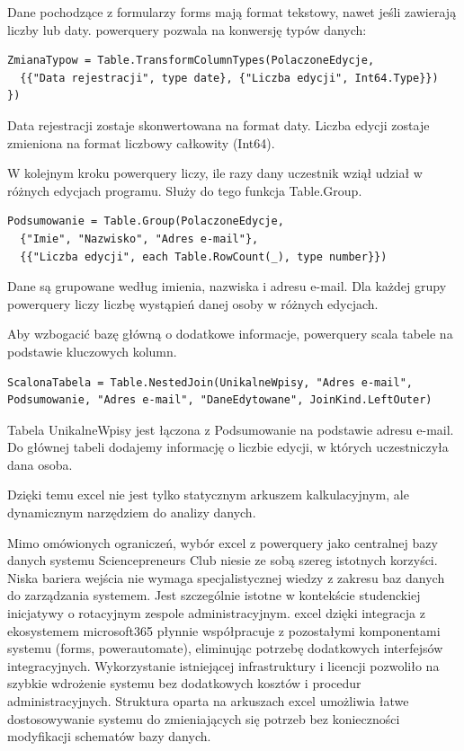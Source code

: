 Dane pochodzące z formularzy \gls{forms} mają format tekstowy, nawet jeśli zawierają liczby lub daty. \gls{powerquery} pozwala na konwersję typów danych:

\begin{lstlisting}[language=PowerQueryM, caption=Kod zmieniający formaty danych w Power Query w języku M źródło: opracowanie własne]
ZmianaTypow = Table.TransformColumnTypes(PolaczoneEdycje,
  {{"Data rejestracji", type date}, {"Liczba edycji", Int64.Type}})
})
\end{lstlisting}
Data rejestracji zostaje skonwertowana na format daty.
Liczba edycji zostaje zmieniona na format liczbowy całkowity (Int64).

W kolejnym kroku \gls{powerquery} liczy, ile razy dany uczestnik wziął udział w różnych edycjach programu. Służy do tego funkcja Table.Group.

\begin{lstlisting}[language=PowerQueryM, caption=Kod grupujący i liczący udział uczestnika w Power Query w języku M źródło: opracowanie własne]
Podsumowanie = Table.Group(PolaczoneEdycje, 
  {"Imie", "Nazwisko", "Adres e-mail"},
  {{"Liczba edycji", each Table.RowCount(_), type number}})
\end{lstlisting}

Dane są grupowane według imienia, nazwiska i adresu e-mail.
Dla każdej grupy \gls{powerquery} liczy liczbę wystąpień danej osoby w różnych edycjach.

Aby wzbogacić bazę główną o dodatkowe informacje, \gls{powerquery} scala tabele na podstawie kluczowych kolumn.

\begin{lstlisting}[language=PowerQueryM, caption=Kod scalający dane z bazą uczestników w Power Query w języku M źródło: opracowanie własne]
ScalonaTabela = Table.NestedJoin(UnikalneWpisy, "Adres e-mail", Podsumowanie, "Adres e-mail", "DaneEdytowane", JoinKind.LeftOuter)
\end{lstlisting}

Tabela UnikalneWpisy jest łączona z Podsumowanie na podstawie adresu e-mail.
Do głównej tabeli dodajemy informację o liczbie edycji, w których uczestniczyła dana osoba.

Dzięki temu \gls{excel} nie jest tylko statycznym arkuszem kalkulacyjnym, ale dynamicznym narzędziem do analizy danych.

Mimo omówionych ograniczeń, wybór \gls{excel} z \gls{powerquery} jako centralnej bazy danych systemu Sciencepreneurs Club niesie ze sobą szereg istotnych korzyści.
Niska bariera wejścia nie wymaga specjalistycznej wiedzy z zakresu baz danych do zarządzania systemem. Jest szczególnie istotne w kontekście studenckiej inicjatywy o rotacyjnym zespole administracyjnym.
\gls{excel} dzięki integracja z ekosystemem \gls{microsoft365} płynnie współpracuje z pozostałymi komponentami systemu (\gls{forms}, \gls{powerautomate}), eliminując potrzebę dodatkowych interfejsów integracyjnych.
Wykorzystanie istniejącej infrastruktury i licencji pozwoliło na szybkie wdrożenie systemu bez dodatkowych kosztów i procedur administracyjnych.
Struktura oparta na arkuszach \gls{excel} umożliwia łatwe dostosowywanie systemu do zmieniających się potrzeb bez konieczności modyfikacji schematów bazy danych.

